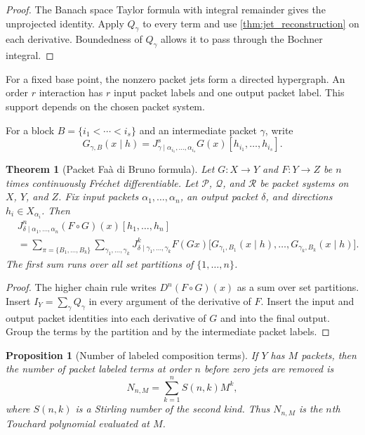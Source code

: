 \documentclass[11pt,a4paper]{article}
\newtheorem{theorem}{Theorem}[section]
\theoremstyle{plain}
\newtheorem{proposition}[proposition]{Proposition}
\theoremstyle{definition}
\theoremstyle{remark}
\newcommand{\Pcal}{\mathcal P}
\newcommand{\Qcal}{\mathcal Q}
\newcommand{\Rcal}{\mathcal R}
\begin{document}
\begin{proof}
The Banach space Taylor formula with integral remainder gives the unprojected identity.  Apply $Q_\gamma$ to every term and use \cref{thm:jet_reconstruction} on each derivative.  Boundedness of $Q_\gamma$ allows it to pass through the Bochner integral.
\end{proof}

For a fixed base point, the nonzero packet jets form a directed hypergraph.  An order $r$ interaction has $r$ input packet labels and one output packet label.  This support depends on the chosen packet system.

For a block $B=\{i_1<\cdots<i_s\}$ and an intermediate packet $\gamma$, write
\[
G_{\gamma,B}(x\mid h)
=
J^s_{\gamma\mid\alpha_{i_1},\ldots,\alpha_{i_s}}G(x)
[h_{i_1},\ldots,h_{i_s}].
\]

\begin{theorem}[Packet Fa\`a di Bruno formula]\label{thm:packet_faa}
Let $G:X\to Y$ and $F:Y\to Z$ be $n$ times continuously Fr\'echet differentiable.  Let $\Pcal$, $\Qcal$, and $\Rcal$ be packet systems on $X$, $Y$, and $Z$.  Fix input packets $\alpha_1,\ldots,\alpha_n$, an output packet $\delta$, and directions $h_i\in X_{\alpha_i}$.  Then
\[
\begin{aligned}
&J^{n}_{\delta\mid\alpha_1,\ldots,\alpha_n}(F\circ G)(x)
[h_1,\ldots,h_n]\\
&=
\sum_{\pi=\{B_1,\ldots,B_k\}}
\sum_{\gamma_1,\ldots,\gamma_k}
J^{k}_{\delta\mid\gamma_1,\ldots,\gamma_k}F(Gx)
\big[
G_{\gamma_1,B_1}(x\mid h),\ldots,
G_{\gamma_k,B_k}(x\mid h)
\big].
\end{aligned}
\]
The first sum runs over all set partitions of $\{1,\ldots,n\}$.
\end{theorem}

\begin{proof}
The higher chain rule writes $D^n(F\circ G)(x)$ as a sum over set partitions.  Insert $I_Y=\sum_\gamma Q_\gamma$ in every argument of the derivative of $F$.  Insert the input and output packet identities into each derivative of $G$ and into the final output.  Group the terms by the partition and by the intermediate packet labels.
\end{proof}

\begin{proposition}[Number of labeled composition terms]\label{prop:faa_term_count}
If $Y$ has $M$ packets, then the number of packet labeled terms at order $n$ before zero jets are removed is
\[
N_{n,M}
=
\sum_{k=1}^{n}S(n,k)M^k,
\]
where $S(n,k)$ is a Stirling number of the second kind.  Thus $N_{n,M}$ is the $n$th Touchard polynomial evaluated at $M$.
\end{proposition}
\end{document}
